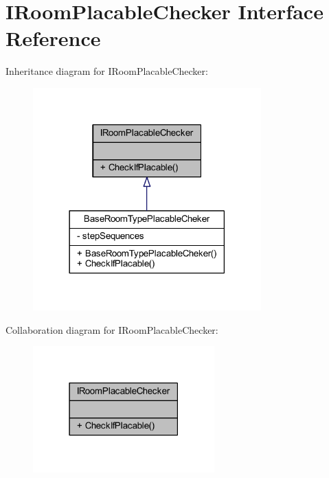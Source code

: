 \hypertarget{interface_i_room_placable_checker}{}\section{I\+Room\+Placable\+Checker Interface Reference}
\label{interface_i_room_placable_checker}


Inheritance diagram for I\+Room\+Placable\+Checker\+:
\nopagebreak
\begin{figure}[H]
\begin{center}
\leavevmode
\includegraphics[width=249pt]{interface_i_room_placable_checker__inherit__graph}
\end{center}
\end{figure}


Collaboration diagram for I\+Room\+Placable\+Checker\+:
\nopagebreak
\begin{figure}[H]
\begin{center}
\leavevmode
\includegraphics[width=198pt]{interface_i_room_placable_checker__coll__graph}
\end{center}
\end{figure}
